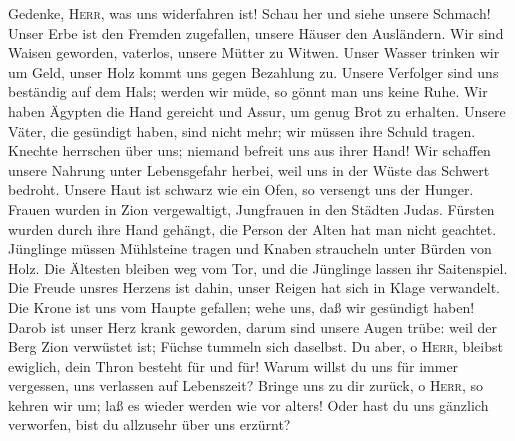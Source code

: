  Gedenke, \textsc{Herr}, was uns widerfahren ist! Schau
her und siehe unsere Schmach!  Unser Erbe ist den Fremden
zugefallen, unsere Häuser den Ausländern.  Wir sind Waisen
geworden, vaterlos, unsere Mütter zu Witwen.  Unser Wasser
trinken wir um Geld, unser Holz kommt uns gegen Bezahlung zu.
 Unsere Verfolger sind uns beständig auf dem Hals; werden
wir müde, so gönnt man uns keine Ruhe.  Wir haben Ägypten
die Hand gereicht und Assur, um genug Brot zu erhalten. 
Unsere Väter, die gesündigt haben, sind nicht mehr; wir müssen ihre
Schuld tragen.  Knechte herrschen über uns; niemand
befreit uns aus ihrer Hand!  Wir schaffen unsere Nahrung
unter Lebensgefahr herbei, weil uns in der Wüste das Schwert bedroht.
 Unsere Haut ist schwarz wie ein Ofen, so versengt uns
der Hunger.  Frauen wurden in Zion vergewaltigt,
Jungfrauen in den Städten Judas.  Fürsten wurden durch
ihre Hand gehängt, die Person der Alten hat man nicht geachtet.
 Jünglinge müssen Mühlsteine tragen und Knaben straucheln
unter Bürden von Holz.  Die Ältesten bleiben weg vom Tor,
und die Jünglinge lassen ihr Saitenspiel.  Die Freude
unsres Herzens ist dahin, unser Reigen hat sich in Klage verwandelt.
 Die Krone ist uns vom Haupte gefallen; wehe uns, daß wir
gesündigt haben!  Darob ist unser Herz krank geworden,
darum sind unsere Augen trübe:  weil der Berg Zion
verwüstet ist; Füchse tummeln sich daselbst.  Du aber, o
\textsc{Herr}, bleibst ewiglich, dein Thron besteht für und für!
 Warum willst du uns für immer vergessen, uns verlassen
auf Lebenszeit?  Bringe uns zu dir zurück, o
\textsc{Herr}, so kehren wir um; laß es wieder werden wie vor alters!
 Oder hast du uns gänzlich verworfen, bist du allzusehr
über uns erzürnt?
